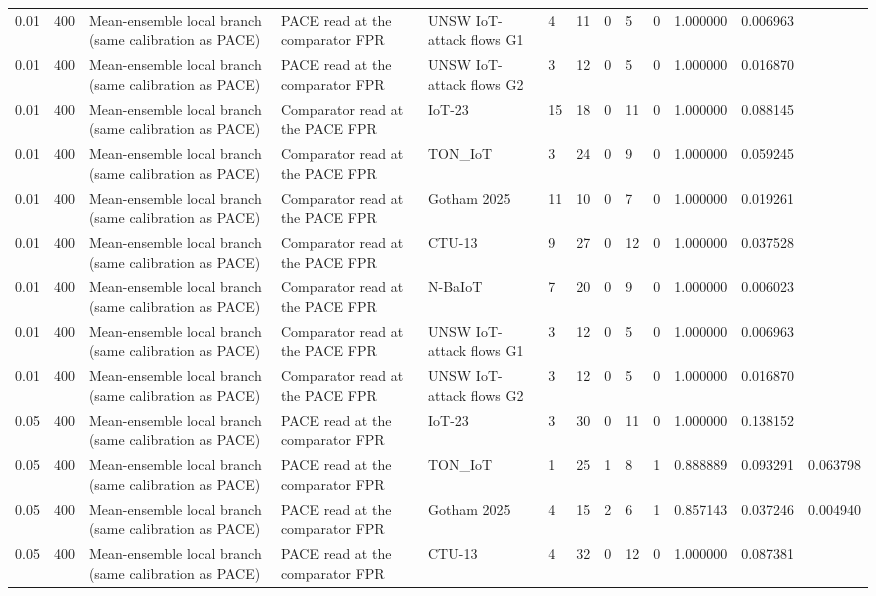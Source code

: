 \begin{tabular}{lllllllllllll}
0.01 & 400 & Mean-ensemble local branch (same calibration as PACE) & PACE read at the comparator FPR & UNSW IoT-attack flows G1 & 4 & 11 & 0 & 5 & 0 & 1.000000 & 0.006963 &  \\
0.01 & 400 & Mean-ensemble local branch (same calibration as PACE) & PACE read at the comparator FPR & UNSW IoT-attack flows G2 & 3 & 12 & 0 & 5 & 0 & 1.000000 & 0.016870 &  \\
0.01 & 400 & Mean-ensemble local branch (same calibration as PACE) & Comparator read at the PACE FPR & IoT-23 & 15 & 18 & 0 & 11 & 0 & 1.000000 & 0.088145 &  \\
0.01 & 400 & Mean-ensemble local branch (same calibration as PACE) & Comparator read at the PACE FPR & TON\_IoT & 3 & 24 & 0 & 9 & 0 & 1.000000 & 0.059245 &  \\
0.01 & 400 & Mean-ensemble local branch (same calibration as PACE) & Comparator read at the PACE FPR & Gotham 2025 & 11 & 10 & 0 & 7 & 0 & 1.000000 & 0.019261 &  \\
0.01 & 400 & Mean-ensemble local branch (same calibration as PACE) & Comparator read at the PACE FPR & CTU-13 & 9 & 27 & 0 & 12 & 0 & 1.000000 & 0.037528 &  \\
0.01 & 400 & Mean-ensemble local branch (same calibration as PACE) & Comparator read at the PACE FPR & N-BaIoT & 7 & 20 & 0 & 9 & 0 & 1.000000 & 0.006023 &  \\
0.01 & 400 & Mean-ensemble local branch (same calibration as PACE) & Comparator read at the PACE FPR & UNSW IoT-attack flows G1 & 3 & 12 & 0 & 5 & 0 & 1.000000 & 0.006963 &  \\
0.01 & 400 & Mean-ensemble local branch (same calibration as PACE) & Comparator read at the PACE FPR & UNSW IoT-attack flows G2 & 3 & 12 & 0 & 5 & 0 & 1.000000 & 0.016870 &  \\
0.05 & 400 & Mean-ensemble local branch (same calibration as PACE) & PACE read at the comparator FPR & IoT-23 & 3 & 30 & 0 & 11 & 0 & 1.000000 & 0.138152 &  \\
0.05 & 400 & Mean-ensemble local branch (same calibration as PACE) & PACE read at the comparator FPR & TON\_IoT & 1 & 25 & 1 & 8 & 1 & 0.888889 & 0.093291 & 0.063798 \\
0.05 & 400 & Mean-ensemble local branch (same calibration as PACE) & PACE read at the comparator FPR & Gotham 2025 & 4 & 15 & 2 & 6 & 1 & 0.857143 & 0.037246 & 0.004940 \\
0.05 & 400 & Mean-ensemble local branch (same calibration as PACE) & PACE read at the comparator FPR & CTU-13 & 4 & 32 & 0 & 12 & 0 & 1.000000 & 0.087381 &  \\

\end{tabular}
